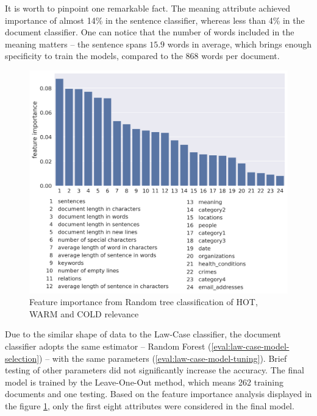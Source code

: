 \documentclass[
  digital, %
  notable,   %
  nolof,     %
  nolot,     %
]{fithesis3}
\begin{document}
It is worth to pinpoint one remarkable fact.
The meaning attribute achieved importance of almost 14\% in the sentence classifier, whereas less than 4\% in the document classifier.
One can notice that the number of words included in the meaning matters -- the sentence spans $15.9$ words in average, which brings enough specificity to train the models, compared to the $868$ words per document.


\begin{figure}[h]
\caption{Feature importance from Random tree classification of HOT, WARM and COLD relevance}
\label{fig:doc_feature_importance}
\includegraphics[width=\textwidth]{img/doc_feature_importance}
\end{figure}


Due to the similar shape of data to the Law-Case classifier, the document classifier adopts the same estimator -- Random Forest (\ref{eval:law-case-model-selection}) -- with the same parameters (\ref{eval:law-case-model-tuning}).
Brief testing of other parameters did not significantly increase the accuracy.
The final model is trained by the Leave-One-Out method, which means 262 training documents and one testing.
Based on the feature importance analysis displayed in the figure \ref{fig:doc_feature_importance}, only the first eight attributes were considered in the final model.
\end{document}
